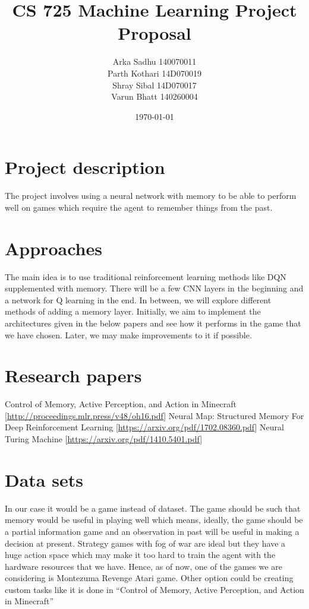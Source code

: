 \documentclass{article}
\title{CS 725 Machine Learning Project Proposal}
\author{
  Arka Sadhu 140070011\\
  Parth Kothari 14D070019\\
  Shray Sibal 14D070017\\
  Varun Bhatt 140260004\\}
\date{\today}
\begin{document}
\maketitle


\section{Project description}
The project involves using a neural network with memory to be able to perform well on games which require the agent to remember things from the past.

\section{Approaches}
The main idea is to use traditional reinforcement learning methods like DQN supplemented with memory. There will be a few CNN layers in the beginning and a network for Q learning in the end. In between, we will explore different methods of adding a memory layer. Initially, we aim to implement the architectures given in the below papers and see how it performs in the game that we have chosen. Later, we may make improvements to it if possible.

\section{Research papers}
Control of Memory, Active Perception, and Action in Minecraft [\url{http://proceedings.mlr.press/v48/oh16.pdf}]
Neural Map: Structured Memory For Deep Reinforcement Learning [\url{https://arxiv.org/pdf/1702.08360.pdf}]
Neural Turing Machine [\url{https://arxiv.org/pdf/1410.5401.pdf}]

\section{Data sets}
In our case it would be a game instead of dataset. The game should be such that memory would be useful in playing well which means, ideally, the game should be a partial information game and an observation in past will be useful in making a decision at present. Strategy games with fog of war are ideal but they have a huge action space which may make it too hard to train the agent with the hardware resources that we have. Hence, as of now, one of the games we are considering is Montezuma Revenge Atari game. Other option could be creating custom tasks like it is done in “Control of Memory, Active Perception, and Action in Minecraft”
\end{document}
